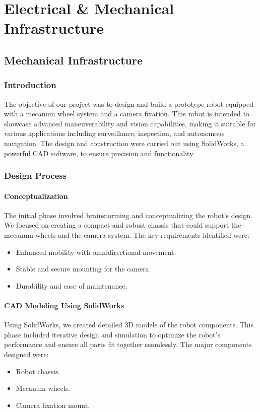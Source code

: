 \part{Electrical \& Mechanical Infrastructure}
\newpage
\chapter{Mechanical Infrastructure}

\section{Introduction}
The objective of our project was to design and build a prototype robot equipped with a mecanum
wheel system and a camera fixation. This robot is intended to showcase advanced maneuverability
and vision capabilities, making it suitable for various applications including surveillance,
inspection, and autonomous navigation. The design and construction were carried out using
SolidWorks, a powerful CAD software, to ensure precision and
functionality.

\section{Design Process} 
\subsection{Conceptualization} 
The initial phase involved brainstorming and conceptualizing the robot's design. We focused on
creating a compact and robust chassis that could support the mecanum wheels and the camera
system. The key requirements identified were:
\begin{itemize}
	\item Enhanced mobility with omnidirectional movement.
	\item Stable and secure mounting for the camera.
	\item Durability and ease of maintenance.
\end{itemize}


\subsection{CAD Modeling Using SolidWorks}
Using SolidWorks, we created detailed 3D models of the robot components. This phase included
iterative design and simulation to optimize the robot's performance and ensure all parts fit together
seamlessly. The major components designed were:
\begin{itemize}
	\item Robot chassis.
	\item Mecanum wheels.
	\item Camera fixation mount.
\end{itemize}

